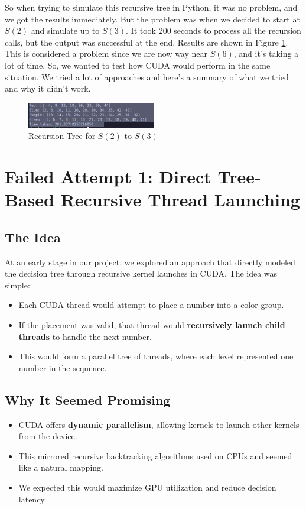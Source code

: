 \documentclass[12pt]{article}
\begin{document}
So when trying to simulate this recursive tree in Python, it was no problem, and we got the results immediately. But the problem was when we decided to start at $S(2)$ and simulate up to $S(3)$. It took 200 seconds to process all the recursion calls, but the output was successful at the end. Results are shown in Figure \ref{fig:pythontime}. \\ 
This is considered a problem since we are now way near $S(6)$, and it's taking a lot of time. So, we wanted to test how CUDA would perform in the same situation. We tried a lot of approaches and here's a summary of what we tried and why it didn't work.
\begin{figure}[h]
    \centering
    \includegraphics[width=0.5\textwidth]{images/pythonTime.png}
    \caption{Recursion Tree for $S(2)$ to $S(3)$}
    \label{fig:pythontime}
\end{figure}
\section{Failed Attempt 1: Direct Tree-Based Recursive Thread Launching}

\subsection{The Idea}
At an early stage in our project, we explored an approach that directly modeled the decision tree through recursive kernel launches in CUDA. The idea was simple:
\begin{itemize}
    \item Each CUDA thread would attempt to place a number into a color group.
    \item If the placement was valid, that thread would \textbf{recursively launch child threads} to handle the next number.
    \item This would form a parallel tree of threads, where each level represented one number in the sequence.
\end{itemize}

\subsection{Why It Seemed Promising}
\begin{itemize}
    \item CUDA offers \textbf{dynamic parallelism}, allowing kernels to launch other kernels from the device.
    \item This mirrored recursive backtracking algorithms used on CPUs and seemed like a natural mapping.
    \item We expected this would maximize GPU utilization and reduce decision latency.
\end{itemize}
\end{document}
